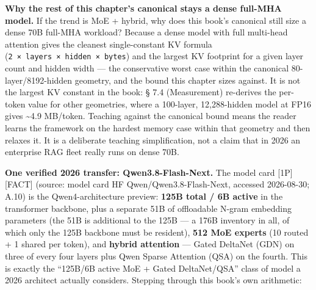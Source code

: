 \textbf{Why the rest of this chapter's canonical stays a dense full-MHA
model.} If the trend is MoE + hybrid, why does this book's canonical
still size a dense 70B full-MHA workload? Because a dense model with
full multi-head attention gives the cleanest single-constant KV formula
(\texttt{2\ ×\ layers\ ×\ hidden\ ×\ bytes}) and the largest KV
footprint for a given layer count and hidden width --- the conservative
worst case within the canonical 80-layer/8192-hidden geometry, and the
bound this chapter sizes against. It is not the largest KV constant in
the book: § 7.4 (Measurement) re-derives the per-token value for other
geometries, where a 100-layer, 12,288-hidden model at FP16 gives
\textasciitilde4.9 MB/token. Teaching against the canonical bound means
the reader learns the framework on the hardest memory case within that
geometry and then relaxes it. It is a deliberate teaching
simplification, not a claim that in 2026 an enterprise RAG fleet really
runs on dense 70B.

\textbf{One verified 2026 transfer: Qwen3.8-Flash-Next.} The model card
\mbox{{[}1P{]}}\hspace{0pt}\mbox{{[}FACT{]}} (source: model card HF Qwen/Qwen3.8-Flash-Next,
accessed 2026-08-30; A.10) is the Qwen4-architecture preview:
\textbf{125B total / 6B active} in the transformer backbone, plus a
separate 51B of offloadable N-gram embedding parameters (the 51B is
additional to the 125B --- a 176B inventory in all, of which only the
125B backbone must be resident), \textbf{512 MoE experts} (10 routed + 1
shared per token), and \textbf{hybrid attention} --- Gated DeltaNet
(GDN) on three of every four layers plus Qwen Sparse Attention (QSA) on
the fourth. This is exactly the ``125B/6B active MoE + Gated
DeltaNet/QSA'' class of model a 2026 architect actually considers.
Stepping through this book's own arithmetic:

